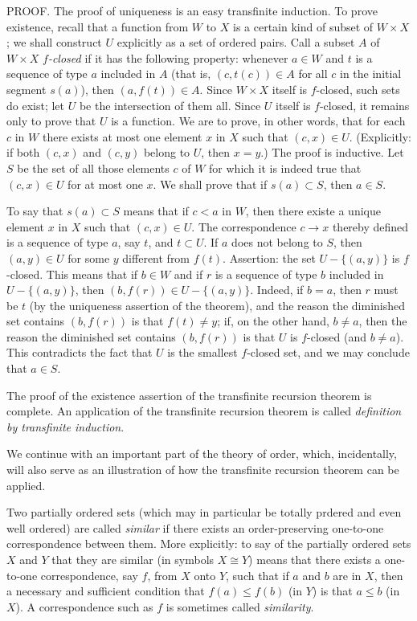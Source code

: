 PROOF. The proof of uniqueness is an easy transfinite induction. To prove existence, recall that a function from $W$ to $X$ is a certain kind of subset of $W \times X$; we shall construct $U$ explicitly as a set of ordered pairs. Call a subset $A$ of $W \times X$ $f$\textit{-closed} if it has the following property: whenever $a \in W$ and $t$ is a sequence of type $a$ included in $A$ (that is, $(c, t(c)) \in A$ for all $c$ in the initial segment $s(a)$), then $(a,f(t)) \in A$. Since $W \times X$ itself is $f$-closed, such sets do exist; let $U$ be the intersection of them all. Since $U$ itself is $f$-closed, it remains only to prove that $U$ is a function. We are to prove, in other words, that for each $c$ in $W$ there exists at most one element $x$ in $X$ such that $(c,x) \in U$. (Explicitly: if both $(c, x)$ and $(c,y)$ belong to $U$, then $x = y$.) The proof is inductive. Let $S$ be the set of all those elements $c$ of $W$ for which it is indeed true that $(c, x) \in U$ for at most one $x$. We shall prove that if $s(a) \subset S$, then $a \in S$. 

To say that $s(a) \subset S$ means that if $c < a$ in $W$, then there existe a unique element $x$ in $X$ such that $(c, x) \in U$. The correspondence $c \rightarrow x$ thereby defined is a sequence of type $a$, say $t$, and $t \subset U$. If $a$ does not belong to $S$, then $(a,y) \in U$ for some $y$ different from $f(t)$. Assertion: the set $U - \{ (a, y) \}$ is $f$-closed. This means that if $b \in W$ and if $r$ is a sequence of type $b$ included in $U - \{ (a, y) \}$, then $(b,f(r)) \in U - \{ (a, y) \}$. Indeed, if $b =a$, then $r$ must be $t$ (by the uniqueness assertion of the theorem), and the reason the diminished set contains $(b, f(r))$ is that $f(t) \neq y$; if, on the other hand, $b \neq a$, then the reason the diminished set contains $(b,f(r))$ is that $U$ is $f$-closed (and $b \neq a$). This contradicts the fact that $U$ is the smallest $f$-closed set, and we may conclude that $a \in S$. 

The proof of the existence assertion of the transfinite recursion theorem is complete. An application of the transfinite recursion theorem is called \textit{definition by transfinite induction}. 

We continue with an important part of the theory of order, which, incidentally, will also serve as an illustration of how the transfinite recursion theorem can be applied. 

Two partially ordered sets (which may in particular be totally prdered and even well ordered) are called \textit{similar} if there exists an order-preserving one-to-one correspondence between them. More explicitly: to say of the partially ordered sets $X$ and $Y$ that they are similar (in symbols $X \cong Y$) means that there exists a one-to-one correspondence, say $f$, from $X$ onto $Y$, such that if $a$ and $b$ are in $X$, then a necessary and sufficient condition that $f(a) \le f(b)$ (in $Y$) is that $a \le b$ (in $X$). A correspondence such as $f$ is sometimes called \textit{similarity}. 

